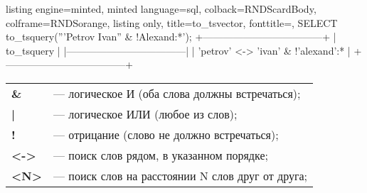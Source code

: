 \begin{frame}[fragile]
      \begin{tcblisting}{
      listing engine=minted,
      minted language=sql,
      colback=RNDScardBody,
      colframe=RNDSorange,
      listing only,
      title=to\_tsvector,
      fonttitle=\normalsize,
    }
SELECT to_tsquery('''Petrov Ivan'' & !Alexand:*');
+------------------------------------+
| to_tsquery                         |
|------------------------------------|
| 'petrov' <-> 'ivan' & !'alexand':* |
+------------------------------------+
  \end{tcblisting}
  \begin{center}
    \begin{tabular}{@{} l l}
      {\bfseries\textcolor{RNDSorange} \&} & — логическое И (оба слова должны встречаться); \\
      {\bfseries\textcolor{RNDSorange} |} & — логическое ИЛИ (любое из слов); \\
      {\bfseries\textcolor{RNDSorange} !} & — отрицание (слово не должно встречаться); \\
      {\bfseries\textcolor{RNDSorange} {\textless -\textgreater}} & — поиск слов рядом, в указанном порядке; \\
      {\bfseries\textcolor{RNDSorange} {\textless N\textgreater}} & — поиск слов на расстоянии N слов друг от друга;
    \end{tabular}
  \end{center}
\end{frame}
